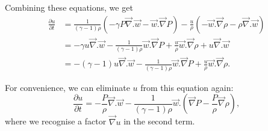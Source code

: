 Combining these equations, we get
\begin{align}
\frac{\partial{}u}{\partial{}t} &= \frac{1}{(\gamma{}-1)\rho{}} \left(
-\gamma{}P \vec{\nabla{}}.\vec{w} - \vec{w}.\vec{\nabla{}}P
\right) -
\frac{u}{\rho{}} \left( -\vec{w}.\vec{\nabla{}}\rho{} - \rho{}\vec{\nabla{}}.\vec{w} \right) \\
&= -\gamma{}u \vec{\nabla{}}.\vec{w} - \frac{1}{(\gamma{}-1)\rho{}} \vec{w}.\vec{\nabla{}}P
+ \frac{u}{\rho{}}\vec{w}.\vec{\nabla{}}\rho{} + u \vec{\nabla{}}.\vec{w} \\
&= -(\gamma{}-1)u \vec{\nabla{}}.\vec{w} - \frac{1}{(\gamma{}-1)\rho{}} \vec{w}.\vec{\nabla{}}P
+ \frac{u}{\rho{}}\vec{w}.\vec{\nabla{}}\rho{}.
\end{align}

For convenience, we can eliminate $u$ from this equation again:
\begin{equation}
\frac{\partial{}u}{\partial{}t} = -\frac{P}{\rho{}}\vec{\nabla{}}.\vec{w}
- \frac{1}{(\gamma{}-1)\rho{}} \vec{w} . \left(
\vec{\nabla{}}P - \frac{P}{\rho{}} \vec{\nabla{}}\rho{}
\right),
\end{equation}
where we recognise a factor $\vec{\nabla{}}u$ in the second term.
